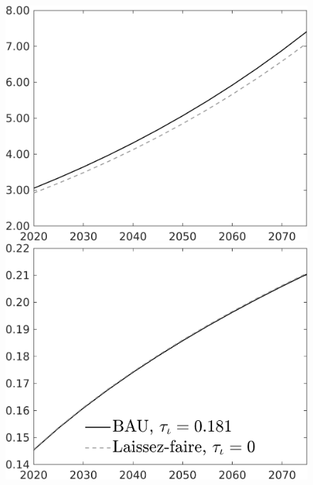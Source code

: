 \documentclass[12pt]{article}
\begin{document}
\begin{figure}[h!!]
\begin{minipage}[]{0.32\textwidth}
	\end{minipage}	
	\begin{minipage}[]{0.32\textwidth}
		\includegraphics[width=1\textwidth]{../../codding_model/own_basedOnFried/optimalPol_010922_revision/figures/all_13Sept22/CompTaul_LFBAU_Reg0_wh_spillover0_nsk0_xgr0_knspil0_sep1_countec0_GovRev0_etaa0.79_lgd0.png}
	\end{minipage}	
	\begin{minipage}[]{0.32\textwidth}
		\includegraphics[width=1\textwidth]{../../codding_model/own_basedOnFried/optimalPol_010922_revision/figures/all_13Sept22/CompTaul_LFBAU_Reg0_GFF_spillover0_nsk0_xgr0_knspil0_sep1_countec0_GovRev0_etaa0.79_lgd1.png}

\end{minipage}
\end{figure}
\end{document}
